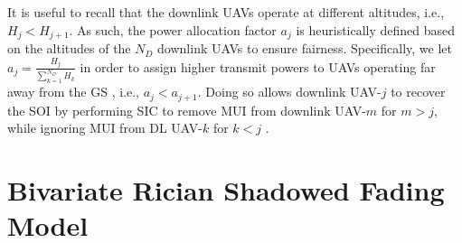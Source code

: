 It is useful to recall that the downlink UAVs operate at different altitudes, i.e., $H_{j} < H_{j+1}$. As such, the power allocation factor $a_j$ is heuristically defined based on the altitudes of the $N_D$ downlink UAVs to ensure fairness. Specifically, we let $a_j = \frac{H_j}{\sum_{k=1}^{N_D} H_k}$ in order to assign higher transmit powers to UAVs operating far away from the GS \cite{liu2018heterogeneous}, i.e., $a_j < a_{j+1}$. Doing so allows downlink UAV-$j$ to recover the SOI by performing SIC to remove MUI from downlink UAV-$m$ for $m>j$, while ignoring MUI from DL UAV-$k$ for $k<j$ \cite{salehi2019meta,islam2017power}.

\begin{table}[]
\centering
\caption{Summary of Important Notations}
\label{table:NOMA_bivariate_Rician_Shadowed_summary_impt_notations} 
\end{table}

\section{Bivariate Rician Shadowed Fading Model} \label{NOMA_bivariate_Rician_Shadowed_sec_bi_var}

